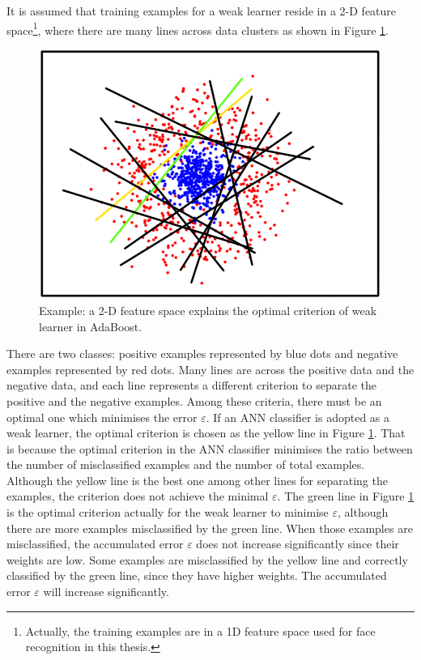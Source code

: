 It is assumed that training examples for a weak learner reside in a 2-D feature space\footnote{Actually, the training examples are in a 1D feature space used for face recognition in this thesis.}, where there are many lines across data clusters as shown in \mbox{Figure} \ref{fig:manythresholds}.
\begin{figure}[ht]
 \begin{center}
  \includegraphics[width=\textwidth*2/3]{ch5/figures/manythreshold.png}
  \caption{Example: a 2-D feature space explains the optimal criterion of weak learner in AdaBoost.}
  \label{fig:manythresholds}
 \end{center}
\end{figure}
There are two classes: positive examples represented by blue dots and negative examples represented by red dots. Many lines are across the positive data and the negative data, and each line represents a different criterion to separate the positive and the negative examples. Among these criteria, there must be an optimal one which minimises the error $\varepsilon$.  If an ANN classifier is adopted as a weak learner, the optimal criterion is chosen as the yellow line in \mbox{Figure} \ref{fig:manythresholds}. That is because the optimal criterion in the ANN classifier minimises the ratio between the number of misclassified examples and the number of total examples. Although the yellow line is the best one among other lines for separating the examples, the criterion does not achieve the minimal $\varepsilon$. The green line in \mbox{Figure} \ref{fig:manythresholds} is the optimal criterion actually for the weak learner to minimise $\varepsilon$, although there are more examples misclassified by the green line. When those examples are misclassified, the accumulated error $\varepsilon$ does not increase significantly since their weights are low. Some examples are misclassified by the yellow line and correctly classified by the green line, since they have higher weights. The accumulated error $\varepsilon$ will increase significantly.

